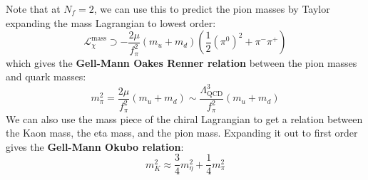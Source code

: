 \documentclass[11pt, oneside]{article}   	%
\theoremstyle{definition}
\numberwithin{equation}{subsection}		%
\begin{document}
Note that at $N_f = 2$, we can use this to predict the pion masses by Taylor expanding the mass Lagrangian to lowest order:
\begin{equation}
	\mathcal L_\chi^\mathrm{mass}\supset -\frac{2\mu}{f_\pi^2} (m_u + m_d) \left(\frac{1}{2} (\pi^0)^2 + \pi^-\pi^+\right)
\end{equation}
which gives the \textbf{Gell-Mann Oakes Renner relation} between the pion masses and quark masses:
\begin{equation}
	m_\pi^2 = \frac{2\mu}{f_\pi^2}(m_u + m_d)\sim \frac{\Lambda_\mathrm{QCD}^3}{f_\pi^2} (m_u + m_d)
\end{equation}
We can also use the mass piece of the chiral Lagrangian to get a relation between the Kaon mass, the eta mass, and the pion mass. 
Expanding it out to first order gives the \textbf{Gell-Mann Okubo relation}:
\begin{equation}
	m_K^2\approx \frac{3}{4} m_\eta^2 + \frac{1}{4} m_\pi^2
\end{equation}

\end{document}
